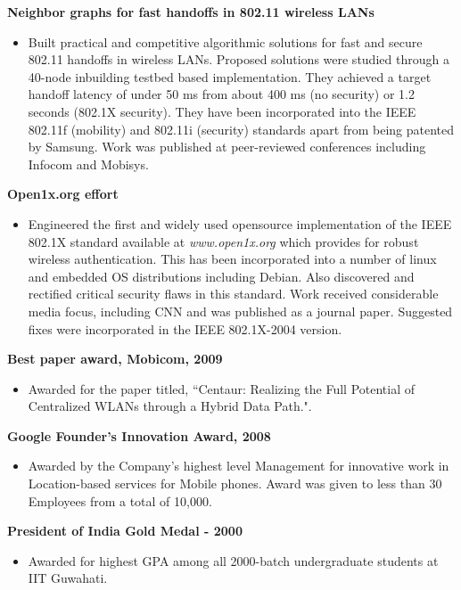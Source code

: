 \begin{resume}
{\bf Neighbor graphs for fast handoffs in 802.11 wireless LANs}
    \begin{itemize}
    \item []
  	Built practical and competitive algorithmic solutions for fast and secure 802.11 handoffs in wireless LANs.
       Proposed solutions were studied through a 40-node inbuilding testbed based implementation. They achieved 
       a target handoff latency of under 50 ms from about 400 ms (no security) or 1.2 seconds (802.1X security).
	They have been incorporated into the IEEE 802.11f (mobility) and 802.11i (security) standards apart from being
       patented by Samsung. Work was published at peer-reviewed conferences including Infocom and Mobisys.
    \end{itemize}
\vspace{-0.2cm}
{\bf Open1x.org effort}
    \begin{itemize}
	\item [] Engineered the first and widely used opensource implementation of the IEEE 802.1X standard available at
{\it www.open1x.org} which provides for robust wireless authentication. This has been incorporated into a number of linux
and embedded OS distributions including Debian. Also discovered and rectified critical security flaws in this standard. 
Work received considerable media focus, including CNN and was published as a journal paper. Suggested fixes were
incorporated in the IEEE 802.1X-2004 version.
    \end{itemize}


{\bf Best paper award, Mobicom, 2009}
    \begin{itemize}
         \item[] Awarded for the paper titled, ``Centaur: Realizing the Full Potential of Centralized WLANs through a Hybrid Data Path.".
    \end{itemize}

{\bf Google Founder's Innovation Award, 2008}
    \begin{itemize}
         \item[] Awarded by the Company's highest level Management for innovative work in
	 Location-based services for Mobile phones. Award was given to less than 30 Employees from a total of 10,000.
    \end{itemize}

{\bf President of India Gold Medal - 2000}
    \begin{itemize}
         \item[] Awarded for highest GPA among all 2000-batch undergraduate students at IIT Guwahati.
    \end{itemize}



\end{resume}
